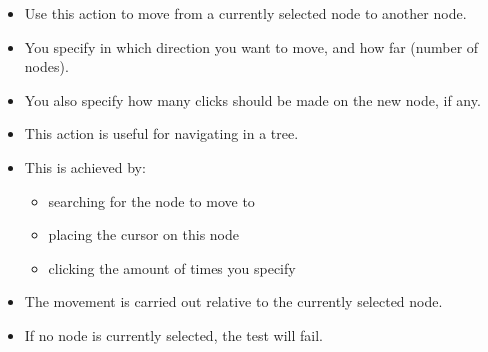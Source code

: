 %
\begin{itemize}
\item Use this action to move from a currently selected node to another node.
\item You specify in which direction you want to move, and how far (number of nodes).
\item You also specify how many clicks should be made on the new node, if any.
\item This action is useful for navigating in a tree.
\item This is achieved by:
\begin{itemize}
\item searching for the node to move to
\item placing the cursor on this node
\item clicking the amount of times you specify
\end{itemize}
\item The movement is carried out relative to the currently selected node. 
\item If no node is currently selected, the test will fail.
\end{itemize}
